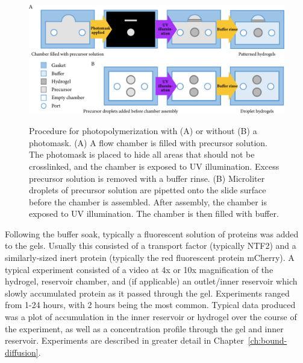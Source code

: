 \begin{figure}
\caption[Photopolymerization with and without photomasks.]{Procedure for photopolymerization with (A) or without (B) a photomask. (A) A flow chamber is filled with precursor solution.  The photomask is placed to hide all areas that should not be crosslinked, and the chamber is exposed to UV illumination.  Excess precursor solution is removed with a buffer rinse. (B) Microliter droplets of precursor solution are pipetted onto the slide surface before the chamber is assembled.  After assembly, the chamber is exposed to UV illumination.  The chamber is then filled with buffer.}
\centering
\includegraphics[width=\textwidth]{figs/ch03/photomask}
\label{fig:photomask}
\end{figure}

Following the buffer soak, typically a fluorescent solution of proteins was added to the gels.  Usually this consisted of a transport factor (typically NTF2) and a similarly-sized inert protein (typically the red fluorescent protein mCherry).  A typical experiment consisted of a video at 4x or 10x magnification of the hydrogel, reservoir chamber, and (if applicable) an outlet/inner reservoir which slowly accumulated protein as it passed through the gel.  Experiments ranged from 1-24 hours, with 2 hours being the most common.  Typical data produced was a plot of accumulation in the inner reservoir or hydrogel over the course of the experiment, as well as a concentration profile through the gel and inner reservoir.  Experiments are described in greater detail in Chapter~\ref{ch:bound-diffusion}.



